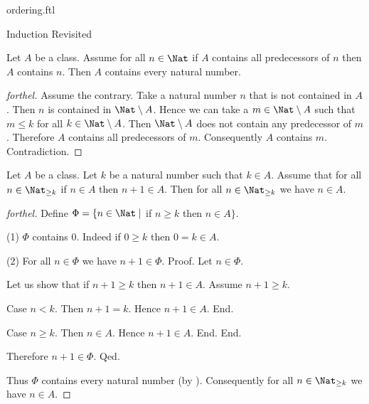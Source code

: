 \documentclass{naproche-library}
\begin{document}
\begin{smodule}[title=The Standard Ordering of the Natural Numbers]{ordering.ftl}
\begin{sfragment}{Induction Revisited}
  \begin{theorem}[forthel,id=ARITHMETIC_04_3609801697263616]
    Let $A$ be a class.
    Assume for all $n \in \Nat$ if $A$ contains all predecessors of $n$ then $A$ contains $n$.
    Then $A$ contains every natural number.
  \end{theorem}
  \begin{proof}[forthel]
    Assume the contrary.
    Take a natural number $n$ that is not contained in $A$.
    Then $n$ is contained in $\Nat \setminus A$.
    Hence we can take a $m \in \Nat \setminus A$ such that $m \leq k$ for all $k \in \Nat \setminus A$.
    Then $\Nat \setminus A$ does not contain any predecessor of $m$.
    Therefore $A$ contains all predecessors of $m$.
    Consequently $A$ contains $m$.
    Contradiction.
  \end{proof}

  \begin{theorem}[forthel,id=ARITHMETIC_04_4976599269113856]
    Let $A$ be a class.
    Let $k$ be a natural number such that $k \in A$.
    Assume that for all $n \in \Nat_{\geq k}$ if $n \in A$ then $n + 1 \in A$.
    Then for all $n \in \Nat_{\geq k}$ we have $n \in A$.
  \end{theorem}
  \begin{proof}[forthel]
    Define $\Phi = \{n \in \Nat \mid$ if $n \geq k$ then $n \in A \}$.

    (1) $\Phi$ contains $0$.
    Indeed if $0 \geq k$ then $0 = k \in A$.

    (2) For all $n \in \Phi$ we have $n + 1 \in \Phi$. \newline
    Proof.
      Let $n \in \Phi$.

      Let us show that if $n + 1 \geq k$ then $n + 1 \in A$.
        Assume $n + 1 \geq k$.

        Case $n < k$.
          Then $n + 1 = k$.
          Hence $n + 1 \in A$.
        End.

        Case $n \geq k$.
          Then $n \in A$.
          Hence $n + 1 \in A$.
        End.
      End.

      Therefore $n + 1 \in \Phi$.
    Qed.

    Thus $\Phi$ contains every natural number (by ).
    Consequently for all $n \in \Nat_{\geq k}$ we have $n \in A$.
  \end{proof}
\end{sfragment}
\end{smodule}
\end{document}
